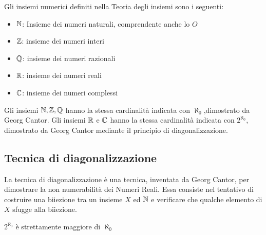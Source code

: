 
Gli insiemi numerici definiti nella Teoria degli insiemi sono i seguenti:
\begin{itemize}
  \item $\mathbb{N}$: Insieme dei numeri naturali, comprendente anche lo $O$
  \item $\mathbb{Z}$: insieme dei numeri interi
  \item $\mathbb{Q}$: insieme dei numeri razionali
  \item $\mathbb{R}$: insieme dei numeri reali
  \item $\mathbb{C}$: insieme dei numeri complessi
\end{itemize}
Gli insiemi $\mathbb{N}, \mathbb{Z}, \mathbb{Q}$ hanno la stessa cardinalità indicata con $\aleph_0$,dimostrato da Georg Cantor.\newline
Gli insiemi $\mathbb{R}$ e $\mathbb{C}$ hanno la stessa cardinalità indicata con $ 2 ^ {\aleph_0}$,
dimostrato da Georg Cantor mediante il principio di diagonalizzazione.

\subsection{Tecnica di diagonalizzazione}
La tecnica di diagonalizzazione è una tecnica, inventata da Georg Cantor, per dimostrare la
non numerabilità dei Numeri Reali.\newline
Essa consiste nel tentativo di costruire una biiezione tra un insieme $X$ ed $\mathbb{N}$
e verificare che qualche elemento di $X$ sfugge alla biiezione.

\begin{thm}
    $2^{\aleph_0}$ è strettamente maggiore di $\aleph_0$
\end{thm}

